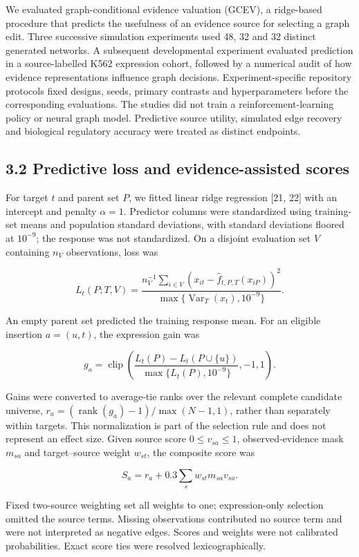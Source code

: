 \documentclass[
  11pt,
]{article}
\begin{document}
We evaluated graph-conditional evidence valuation (GCEV), a ridge-based
procedure that predicts the usefulness of an evidence source for
selecting a graph edit. Three successive simulation experiments used 48,
32 and 32 distinct generated networks. A subsequent developmental
experiment evaluated prediction in a source-labelled K562 expression
cohort, followed by a numerical audit of how evidence representations
influence graph decisions. Experiment-specific repository protocols
fixed designs, seeds, primary contrasts and hyperparameters before the
corresponding evaluations. The studies did not train a
reinforcement-learning policy or neural graph model. Predictive source
utility, simulated edge recovery and biological regulatory accuracy were
treated as distinct endpoints.

\subsection{3.2 Predictive loss and evidence-assisted
scores}\label{predictive-loss-and-evidence-assisted-scores}

For target \(t\) and parent set \(P\), we fitted linear ridge regression
{[}21, 22{]} with an intercept and penalty \(\alpha=1\). Predictor
columns were standardized using training-set means and population
standard deviations, with standard deviations floored at \(10^{-9}\);
the response was not standardized. On a disjoint evaluation set \(V\)
containing \(n_V\) observations, loss was

\[
L_t(P;T,V)=
\frac{n_V^{-1}\sum_{i\in V}(x_{it}-\widehat f_{t,P,T}(x_{iP}))^2}
{\max\{\operatorname{Var}_{T}(x_t),10^{-9}\}}.
\]

An empty parent set predicted the training response mean. For an
eligible insertion \(a=(u,t)\), the expression gain was

\[
g_a=\operatorname{clip}\!\left(
\frac{L_t(P)-L_t(P\cup\{u\})}{\max\{L_t(P),10^{-9}\}},-1,1
\right).
\]

Gains were converted to average-tie ranks over the relevant complete
candidate universe, \(r_a=(\operatorname{rank}(g_a)-1)/\max(N-1,1)\),
rather than separately within targets. This normalization is part of the
selection rule and does not represent an effect size. Given source score
\(0\le v_{sa}\le1\), observed-evidence mask \(m_{sa}\) and
target--source weight \(w_{st}\), the composite score was

\[
S_a=r_a+0.3\sum_s w_{st}m_{sa}v_{sa}.
\]

Fixed two-source weighting set all weights to one; expression-only
selection omitted the source terms. Missing observations contributed no
source term and were not interpreted as negative edges. Scores and
weights were not calibrated probabilities. Exact score ties were
resolved lexicographically.
\end{document}
